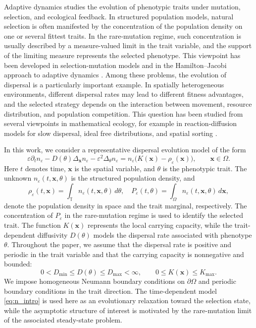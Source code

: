 \documentclass[11pt]{article}
\begin{document}
Adaptive dynamics studies the evolution of phenotypic traits under mutation, selection, and ecological feedback. In structured population models, natural selection is often manifested by the concentration of the population density on one or several fittest traits. In the rare-mutation regime, such concentration is usually described by a measure-valued limit in the trait variable, and the support of the limiting measure represents the selected phenotype. This viewpoint has been developed in selection-mutation models and in the Hamilton--Jacobi approach to adaptive dynamics \cite{BarlesPerthame, DiekmannJabinMischlerPerthame}. Among these problems, the evolution of dispersal is a particularly important example. In spatially heterogeneous environments, different dispersal rates may lead to different fitness advantages, and the selected strategy depends on the interaction between movement, resource distribution, and population competition. This question has been studied from several viewpoints in mathematical ecology, for example in reaction-diffusion models for slow dispersal, ideal free distributions, and spatial sorting \cite{DockeryHutsonMischaikowPernarowski1998, Hastings1983,Ronce2007}.

In this work, we consider a representative dispersal evolution model of the form 
\begin{equation}\label{eq:n_intro} 
	\varepsilon \partial_t n_\varepsilon -D(\theta)\Delta_{\mathbf{x}} n_\varepsilon -\varepsilon^2\Delta_\theta n_\varepsilon = n_\varepsilon\bigl(K(\mathbf{x})-\rho_\varepsilon(\mathbf{x})\bigr), \qquad \mathbf{x}\in\Omega . \end{equation} 
Here \(t\) denotes time, \(\mathbf{x}\) is the spatial variable, and \(\theta\) is the phenotypic trait. The unknown
\(n_\varepsilon(t,\mathbf{x},\theta)\) is the structured population density, and 
\[ 
	\rho_\varepsilon(t,\mathbf{x}) = \int_{\mathbb T} n_\varepsilon(t,\mathbf{x},\theta)\,d\theta, \quad 
	P_\varepsilon(t,\theta) = \int_\Omega n_\varepsilon(t,\mathbf{x},\theta)\,d\mathbf{x},  
\]
denote the population density in space and the trait marginal, respectively. 
The concentration of \(P_\varepsilon\) in the rare-mutation regime is used to identify the selected trait. 
The function \(K(\mathbf{x})\) represents the local carrying capacity, while the trait-dependent diffusivity \(D(\theta)\) models the dispersal rate associated with phenotype \(\theta\). Throughout the paper, we assume that the dispersal rate is positive and periodic in the trait variable and that the carrying capacity is nonnegative and bounded: 
 \begin{equation}\label{eq:basic_assumptions} 
 	0<D_{\min}\le D(\theta)\le D_{\max}<\infty, \qquad 0\le K(\mathbf{x})\le K_{\max}. 
\end{equation} 
We impose homogeneous Neumann boundary conditions on \(\partial\Omega\) and periodic boundary conditions in the trait direction. The time-dependent model \eqref{eq:n_intro} is used here as an evolutionary relaxation toward the selection state, while the asymptotic structure of interest is motivated by the rare-mutation limit of the associated steady-state problem.
\end{document}

